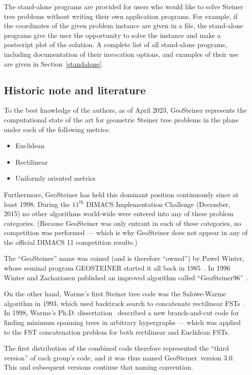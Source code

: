 \documentclass[12pt,twoside,letterpaper]{article}
\def\geosteiner{Geo\-Steiner}
\begin{document}
The stand-alone programs are provided for users who would like to
solve Steiner tree problems without writing their own application
programs. For example, if the coordinates of the given problem
instance are given in a file, the stand-alone programs give the user
the opportunity to solve the instance and make a postscript plot of
the solution. A complete list of all stand-alone programs, including
docu\-mentation of their invocation options, and examples of their use
are given in Section~\ref{standalone}.


\subsection{Historic note and literature}
\label{intro_literature}

To the best knowledge of the authors, as of April 2023, GeoSteiner
represents the computational state of the art for geometric Steiner
tree problems in the plane under each of the following metrics:
\begin{itemize}
 \item Euclidean
 \item Rectilinear
 \item Uniformly oriented metrics
\end{itemize}
Furthermore, GeoSteiner has held this dominant position continuously
since at least 1998.
During the $11^{\mathrm{th}}$ DIMACS Implementation Challenge
(December, 2015) no other algorithms world-wide were entered into any
of these problem categories.
(Because GeoSteiner was only entrant in each of these categories, no
competition was performed --- which is why GeoSteiner does not appear
in any of the official DIMACS 11 competition results.)

The ``GeoSteiner'' name was coined (and is therefore ``owned'') by Pawel
Winter, whose seminal program GEOSTEINER started it all back in
1985~\cite{Winter85}. In 1996 Winter and Zachariasen published an
improved algorithm called ``GeoSteiner96''~\cite{WinterZachariasen97}.

On the other hand, Warme's first Steiner tree code was the Salowe-Warme
algorithm in 1993, which used backtrack search to concatenate
rectilinear FSTs~\cite{SaloweWarme95}.  In 1998, Warme's Ph.D.
dissertation~\cite{Warme98} described a new branch-and-cut code for
finding minimum spanning trees in arbitrary hypergraphs --- which was
applied to the FST concatenation problem for both rectilinear and
Euclidean FSTs. 

The first distribution of the combined code therefore represented the
``third version'' of each group's code, and it was thus named
\geosteiner\ version 3.0. This and subsequent versions continue
that naming convention.
\end{document}
